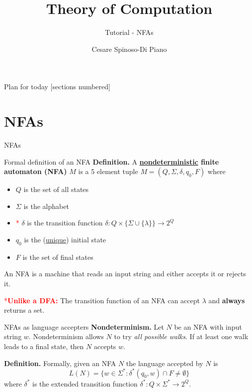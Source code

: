 \documentclass[10pt]{beamer}
\title{Theory of Computation}
\subtitle{Tutorial - NFAs}
\date{}
\author{Cesare Spinoso-Di Piano}
\begin{document}
\maketitle

\begin{frame}{Plan for today}
    [sections numbered]
    \tableofcontents[hideallsubsections]
\end{frame}


\section{NFAs}

\begin{frame}{NFAs}

\end{frame}

\begin{frame}[t]{Formal definition of an NFA}
    \textbf{Definition.} A \textbf{\underline{nondeterministic} finite automaton (NFA)} $M$ is a 5 element tuple $M = (Q, \Sigma, \delta, q_0, F)$ where
    \begin{itemize}
        \item $Q$ is the set of all states
        \item $\Sigma$ is the alphabet
        \item \textcolor{red}{*} $\delta$ is the transition function $\delta: Q \times \{\Sigma \cup \{\lambda\} \} \rightarrow 2^Q$
        \item $q_0$ is the (\underline{unique}) initial state
        \item $F$ is the set of final states
    \end{itemize}
    An NFA is a machine that reads an input string and either accepts it or rejects it.

    \textcolor{red}{*\textbf{Unlike a DFA: }}
    The transition function of an NFA can accept $\lambda$ and \textbf{always} returns a set.
\end{frame}


\begin{frame}{NFAs as language accepters}
    \textbf{Nondeterminism.} Let $N$ be an NFA with input string $w$. Nondeterminism allows $N$ to try \textit{all possible walks}. If at least one walk leads to a final state, then $N$ accepts $w$.

    \textbf{Definition.} Formally, given an NFA $N$ the language accepted by $N$ is
    \[
        L(N) = \{w \in \Sigma ^*: \delta^*(q_0, w) \cap F \neq \emptyset\}
    \]
    where $\delta^*$ is the extended transition function $\delta^*: Q \times \Sigma^* \rightarrow 2^Q$.
\end{frame}
\end{document}
